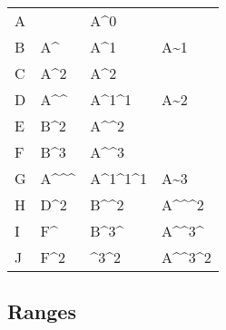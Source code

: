 {\scriptsize
\begin{tabular}{l l l l}
    A &                       & A\textasciicircum 0  \\
    B & A\textasciicircum     & A\textasciicircum 1   & A\textasciitilde 1 \\  
    C & A\textasciicircum 2   & A\textasciicircum 2 \\
    D & A\textasciicircum\textasciicircum     & A\textasciicircum1\textasciicircum1   & A\textasciitilde 2 \\
    E & B\textasciicircum 2   & A\textasciicircum\textasciicircum 2 \\
    F & B\textasciicircum 3   & A\textasciicircum\textasciicircum 3 \\
    G & A\textasciicircum\textasciicircum\textasciicircum & A\textasciicircum 1\textasciicircum 1\textasciicircum 1     & A\textasciitilde 3  \\
    H & D\textasciicircum 2   & B\textasciicircum\textasciicircum 2   & A\textasciicircum\textasciicircum\textasciicircum 2  \\
    I & F\textasciicircum   & B\textasciicircum 3\textasciicircum   & A\textasciicircum\textasciicircum 3\textasciicircum   \\
    J & F\textasciicircum 2     & \textasciicircum 3\textasciicircum 2  & A\textasciicircum\textasciicircum 3\textasciicircum 2  \\
\end{tabular}}

\subsection*{Ranges}

